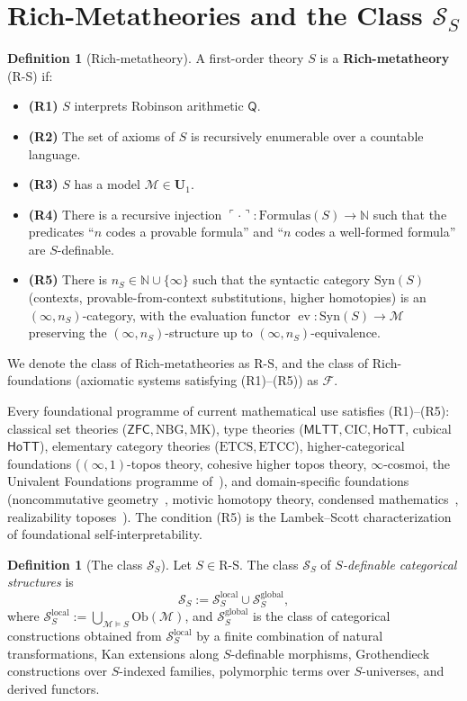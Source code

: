 \documentclass[11pt]{article}
\theoremstyle{plain}
\theoremstyle{definition}
\newtheorem{definition}[theorem]{Definition}
\newcommand{\RS}{\mathrm{R\text{-}S}}
\newcommand{\cS}{\mathcal{S}}
\newcommand{\cF}{\mathcal{F}}
\newcommand{\cM}{\mathcal{M}}
\newcommand{\Ob}{\mathrm{Ob}}
\newcommand{\Syn}{\mathrm{Syn}}
\newcommand{\ZFC}{\mathsf{ZFC}}
\newcommand{\MLTT}{\mathsf{MLTT}}
\newcommand{\HoTT}{\mathsf{HoTT}}
\DeclareMathOperator{\ev}{ev}
\begin{document}
\section{Rich-Metatheories and the Class $\cS_S$}\label{sec:rs}

\begin{definition}[Rich-metatheory]\label{def:rs}
A first-order theory $S$ is a \textbf{Rich-metatheory} (R-S) if:
\begin{itemize}
\item \textbf{(R1)} $S$ interprets Robinson arithmetic $\mathsf{Q}$.
\item \textbf{(R2)} The set of axioms of $S$ is recursively enumerable over a countable language.
\item \textbf{(R3)} $S$ has a model $\cM \in \mathbf{U}_1$.
\item \textbf{(R4)} There is a recursive injection $\ulcorner \cdot \urcorner : \mathrm{Formulas}(S) \to \mathbb{N}$ such that the predicates ``$n$ codes a provable formula'' and ``$n$ codes a well-formed formula'' are $S$-definable.
\item \textbf{(R5)} There is $n_S \in \mathbb{N} \cup \{\infty\}$ such that the syntactic category $\Syn(S)$ (contexts, provable-from-context substitutions, higher homotopies) is an $(\infty, n_S)$-category, with the evaluation functor $\ev : \Syn(S) \to \cM$ preserving the $(\infty, n_S)$-structure up to $(\infty, n_S)$-equivalence.
\end{itemize}
We denote the class of Rich-metatheories as $\RS$, and the class of Rich-foundations (axiomatic systems satisfying (R1)--(R5)) as $\cF$.
\end{definition}

Every foundational programme of current mathematical use satisfies (R1)--(R5): classical set theories ($\ZFC, \mathrm{NBG}, \mathrm{MK}$), type theories ($\MLTT, \mathrm{CIC}, \HoTT$, cubical $\HoTT$), elementary category theories ($\mathrm{ETCS}, \mathrm{ETCC}$), higher-categorical foundations ($(\infty, 1)$-topos theory, cohesive higher topos theory, $\infty$-cosmoi, the Univalent Foundations programme of~\cite{HoTTBook2013, Voevodsky2010}), and domain-specific foundations (noncommutative geometry~\cite{Connes1994}, motivic homotopy theory, condensed mathematics~\cite{ClausenScholze2019}, realizability toposes~\cite{Hyland1982}). The condition (R5) is the Lambek--Scott characterization of foundational self-interpretability.

\begin{definition}[The class $\cS_S$]\label{def:SS}
Let $S \in \RS$. The class $\cS_S$ of \emph{$S$-definable categorical structures} is
\[ \cS_S := \cS_S^{\mathrm{local}} \cup \cS_S^{\mathrm{global}}, \]
where $\cS_S^{\mathrm{local}} := \bigcup_{\cM \models S} \Ob(\cM)$, and $\cS_S^{\mathrm{global}}$ is the class of categorical constructions obtained from $\cS_S^{\mathrm{local}}$ by a finite combination of natural transformations, Kan extensions along $S$-definable morphisms, Grothendieck constructions over $S$-indexed families, polymorphic terms over $S$-universes, and derived functors.
\end{definition}
\end{document}
